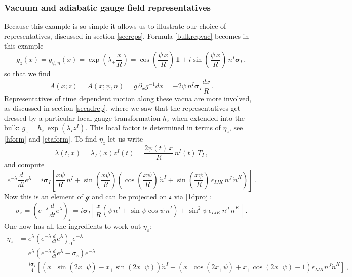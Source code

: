 \documentclass[11pt,a4paper]{article}
\def\calsg{{\boldsymbol{\mathscr g}}}
\def\calss{{\boldsymbol{\mathscr s}}}
\def\uI{{\underline{I}}}
\begin{document}
    \subsubsection{Vacuum and adiabatic gauge field representatives}
    Because this example is so simple it allows us to illustrate our choice of representatives, discussed in section \ref{secreps}. Formula \eqref{bulkrepvac} becomes in this example
    \begin{equation}
    g_z(x)=g_{\psi,n}(x)=\exp\left(\lambda_+\frac{x}{R}\right)=\cos\left(\frac{\psi\,x}{R}\right)\,\mathbf{1}+i\sin\left(\frac{\psi\,x}{R}\right)\,n^I{\bm \sigma}_I\,,
    \end{equation}
    so that we find
    \begin{equation}
    \bar A(x;z)=\bar A(x;\psi,n)=g\,\partial_xg^{-1}dx=-2\psi\,n^I{\bm \sigma}_I\frac{dx}{R}\label{vacs}\,.
    \end{equation}
    Representatives of time dependent motion along these vacua are more involved, as discussed in section \ref{secadrep}, where we saw that the representatives get dressed by a particular local gauge transformation $h_z$ when extended into the bulk: $g_z=h_z\,\exp(\lambda_\uI z^I)$. This local factor is determined in terms of $\eta_z$, see \eqref{hform} and \eqref{etaform}.
    To find $\eta_z$ let us write 
    \begin{equation}
    \lambda(t,x)=\lambda_{\uI}(x)z^I(t)=\frac{2\psi(t)\,x}{R}\, n^I(t)\,T_I\,,
    \end{equation}
    and compute
    \begin{equation}
    e^{-\lambda}\frac{d}{dt} e^{\lambda}=i{\bm\sigma}_I\left[\frac{x\dot \psi}{R}\, n^I+\sin\left(\frac{x\psi}{R}\right)\left(\cos\left(\frac{x\psi}{R}\right)\,\dot n^I+\sin\left(\frac{x\psi}{R}\right)\,\epsilon_{IJK}\,n^J\,\dot n^K\right)\right]\,.
    \end{equation}
    Now this is an element of $\calsg$ and can be projected on $\calss$ via \eqref{1dproj}:
    \begin{equation}
    \sigma_z=\left(e^{-\lambda}\frac{d}{dt} e^{\lambda}\right)_\calss=i{\bm\sigma}_I\left[\frac{x}{R}\left(\dot\psi\, n^I+\sin\psi\cos\psi\,\dot n^I\right)+\sin^2\psi\,\epsilon_{IJK}\,n^J\,\dot n^K\right]\,.
    \end{equation}
    One now has all the ingredients to work out $\eta_z$:
    \begin{align}
\nonumber        \eta_z&=e^{\lambda}\left(e^{-\lambda}\frac{d}{dt} e^\lambda\right)_0e^{-\lambda}\\
\nonumber &=e^{\lambda}\left(e^{-\lambda}\frac{d}{dt} e^\lambda-\sigma_z\right)e^{-\lambda}\\
        &=\frac{i{\bm\sigma}_I}{4}\left[\left(x_-\sin(2x_+\psi)-x_+\sin(2x_-\psi)\right)\dot n^I+\left(x_-\cos(2x_+\psi)+x_+\cos(2x_-\psi)-1\right)\epsilon_{IJK}n^J\dot n^K\right]\label{eta1d}\,,
    \end{align}
\end{document}
